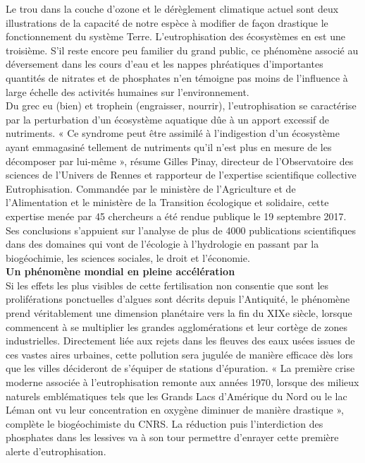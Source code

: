 \documentclass[8pt]{article}
\begin{document}
Le trou dans la couche d’ozone et le dérèglement climatique actuel sont deux illustrations de la capacité de notre espèce à modifier de façon drastique le fonctionnement du système Terre. L’eutrophisation des écosystèmes en est une troisième. S’il reste encore peu familier du grand public, ce phénomène associé au déversement dans les cours d’eau et les nappes phréatiques d’importantes quantités de nitrates et de phosphates n’en témoigne pas moins de l’influence à large échelle des activités humaines sur l’environnement.\\

Du grec eu (bien) et trophein (engraisser, nourrir), l’eutrophisation se caractérise par la perturbation d'un écosystème aquatique dûe à un apport excessif de nutriments. « Ce syndrome peut être assimilé à l’indigestion d’un écosystème ayant emmagasiné tellement de nutriments qu’il n’est plus en mesure de les décomposer par lui-même », résume Gilles Pinay, directeur de l’Observatoire des sciences de l’Univers de Rennes et rapporteur de l’expertise scientifique collective Eutrophisation. Commandée par le ministère de l’Agriculture et de l’Alimentation et le ministère de la Transition écologique et solidaire, cette expertise menée par 45 chercheurs a été rendue publique le 19 septembre 2017. Ses conclusions s’appuient sur l’analyse de plus de 4000 publications scientifiques dans des domaines qui vont de l’écologie à l’hydrologie en passant par la biogéochimie, les sciences sociales, le droit et l’économie.\\

\textbf{Un phénomène mondial en pleine accélération}\\

Si les effets les plus visibles de cette fertilisation non consentie que sont les proliférations ponctuelles d’algues sont décrits depuis l’Antiquité, le phénomène prend véritablement une dimension planétaire vers la fin du XIXe siècle, lorsque commencent à se multiplier les grandes agglomérations et leur cortège de zones industrielles. Directement liée aux rejets dans les fleuves des eaux usées issues de ces vastes aires urbaines, cette pollution sera jugulée de manière efficace dès lors que les villes décideront de s’équiper de stations d’épuration. « La première crise moderne associée à l’eutrophisation remonte aux années 1970, lorsque des milieux naturels emblématiques tels que les Grands Lacs d’Amérique du Nord ou le lac Léman ont vu leur concentration en oxygène diminuer de manière drastique », complète le biogéochimiste du CNRS. La réduction puis l’interdiction des phosphates dans les lessives va à son tour permettre d’enrayer cette première alerte d’eutrophisation.\\
\end{document}
